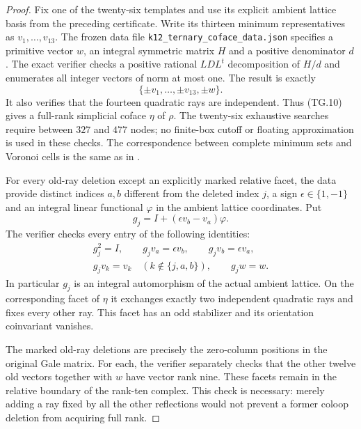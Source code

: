 \begin{proof}
Fix one of the twenty-six templates and use its explicit ambient
lattice basis from the preceding certificate. Write its thirteen
minimum representatives as $v_1,\ldots,v_{13}$.
The frozen data file \texttt{k12\_ternary\_coface\_data.json}
specifies a primitive vector $w$, an integral symmetric matrix $H$
and a positive denominator $d$. The exact verifier checks a positive
rational $LDL^t$ decomposition of $H/d$ and enumerates all integer
vectors of norm at most one. The result is exactly
\[
             \{\pm v_1,\ldots,\pm v_{13},\pm w\}.              \tag{TG.10}
\]
It also verifies that the fourteen quadratic rays are independent.
Thus (TG.10) gives a full-rank simplicial coface $\eta$ of $\rho$.
The twenty-six exhaustive searches require between $327$ and $477$
nodes; no finite-box cutoff or floating approximation is used in
these checks. The correspondence between complete minimum sets and
Voronoi cells is the same as in
\cite[\S1.2.1, p.~4; \S2.1, p.~6]{DEKM2026}.

For every old-ray deletion except an explicitly marked relative
facet, the data provide distinct indices $a,b$ different from the
deleted index $j$, a sign $\epsilon\in\{1,-1\}$ and an integral
linear functional $\varphi$ in the ambient lattice coordinates.
Put
\[
       g_j=I+(\epsilon v_b-v_a)\varphi.                         \tag{TG.11}
\]
The verifier checks every entry of the following identities:
\[
\begin{gathered}
g_j^2=I,\qquad g_jv_a=\epsilon v_b,\qquad
g_jv_b=\epsilon v_a,\\
g_jv_k=v_k\quad(k\notin\{j,a,b\}),\qquad g_jw=w.
\end{gathered}                                                  \tag{TG.12}
\]
In particular $g_j$ is an integral automorphism of the actual ambient
lattice. On the corresponding facet of $\eta$ it exchanges exactly
two independent quadratic rays and fixes every other ray. This
facet has an odd stabilizer and its orientation coinvariant vanishes.

The marked old-ray deletions are precisely the zero-column positions
in the original Gale matrix. For each, the verifier separately checks
that the other twelve old vectors together with $w$ have vector rank
nine. These facets remain in the relative boundary of the rank-ten
complex. This check is necessary: merely adding a ray fixed by all
the other reflections would not prevent a former coloop deletion
from acquiring full rank.


\end{proof}
